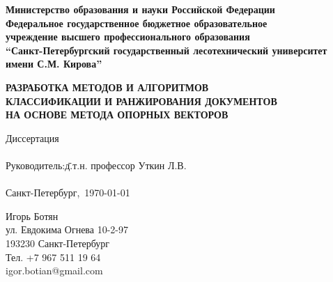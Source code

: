 \begin{titlepage}

\setlength{\parindent}{0pt}

\begin{center}
	\textbf{%
		Министерство образования и науки Российской Федерации\\ %
		Федеральное государственное бюджетное образовательное\\ %
		учреждение высшего профессионального образования\\ %
		``Санкт-Петербургский государственный лесотехнический университет\\ %
		имени С.М. Кирова''
	}
\end{center}

\begin{comment}
Факультет: Механической технологии древесины
Кафедра: Управления и автоматизации производственных процессов
Специальность: 05.13.01 ``Системный анализ, управление и обработка информации (в химико-лесном комплексе)''
\end{comment}

\vspace*{10em}

\begin{center}
\textbf{%
	РАЗРАБОТКА МЕТОДОВ И АЛГОРИТМОВ\\%
	КЛАССИФИКАЦИИ И РАНЖИРОВАНИЯ ДОКУМЕНТОВ\\%
	НА ОСНОВЕ МЕТОДА ОПОРНЫХ ВЕКТОРОВ\\%
}
\end{center}

\vspace*{13em}

\begin{tabbing}
Диссертация\\
\\
Руководитель:\quad\= д.т.н. профессор Уткин Л.В.\\
\\
Санкт-Петербург,\ \today
\end{tabbing}

\vspace*{5em}

Игорь Ботян\\
ул. Евдокима Огнева 10-2-97\\
193230 Санкт-Петербург\\
Тел. +7 967 511 19 64\\
igor.botian@gmail.com

\end{titlepage}

\begin{comment}
Титульный лист является первой страницей диссертации, служит источником информации, необходимой для обработки и поиска документа. 
На титульном листе приводят следующие сведения:
- наименование организации, где выполнена диссертация- статус диссертации - ``на правах рукописи''
- фамилию, имя, отчество диссертанта
- название диссертации
- шифр и наименование специальности
- искомую степень и отрасль науки
- фамилию, имя, отчество научного руководителя или консультанта, учёную степень и учёное звание
- место и год написания диссертации
\end{comment}